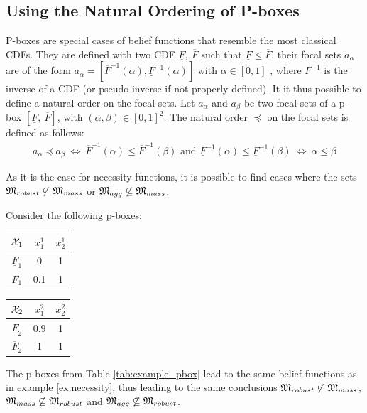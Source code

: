 \subsection{Using the Natural Ordering of P-boxes}\label{subsec:pboxes}
P-boxes are special cases of belief functions that resemble the most classical CDFs. They are defined with two CDF $\underline{F},~\overline{F}$ such that $\underline{F}\leqslant\overline{F}$, their focal sets $a_\alpha$ are of the form $a_\alpha=[\overline{F}^{-1}(\alpha), \underline{F}^{-1}(\alpha)]$ with $\alpha\in[0,1]$ \cite{destercke_unifying_2008}, where $F^{-1}$ is the inverse of a CDF (or pseudo-inverse if not properly defined). It it thus possible to define a natural order on the focal sets. Let $a_\alpha$ and $a_\beta$ be two focal sets of a p-box $[\underline{F},~\overline{F}]$, with $(\alpha,\beta)\in[0,1]^2$. The natural order $\preceq$ on the focal sets is defined as follows:
\begin{align}
    a_\alpha\preceq a_\beta ~\Leftrightarrow~ \overline{F}^{-1}(\alpha)\leqslant\overline{F}^{-1}(\beta) \text{ and } \underline{F}^{-1}(\alpha)\leqslant\underline{F}^{-1}(\beta)~\Leftrightarrow~ \alpha\leqslant\beta\label{eq:order_pbox}
\end{align}

As it is the case for necessity functions, it is possible to find cases where the sets ${\mathfrak{M}}_{robust}\not\subseteq {\mathfrak{M}}_{mass}$ or ${\mathfrak{M}}_{agg}\not\subseteq{\mathfrak{M}}_{mass}$.
\begin{example}\label{ex:pbox}
    Consider the following p-boxes:
    \begin{center}
    \begin{tabular}{|c|c|c|}
        \hline
        ${\mathcal{X}}_1$ & $x^1_1$ & $x^1_2$\\
        \hline\hline
        $\underline{F}_1$ & 0 & 1\\
        \hline
        $\overline{F}_1$ & 0.1 & 1\\
        \hline
    \end{tabular}
    \qquad
    \begin{tabular}{|c|c|c|}
        \hline
        ${\mathcal{X}}_2$ & $x^2_1$ & $x^2_2$\\
        \hline\hline
        $\underline{F}_2$ & 0.9 & 1\\
        \hline
        $\overline{F}_2$ & 1 & 1\\
        \hline
    \end{tabular}
    \label{tab:example_pbox}
    \end{center}
    The p-boxes from Table \ref{tab:example_pbox} lead to the same belief functions as in example \ref{ex:necessity}, thus leading to the same conclusions \ie ${\mathfrak{M}}_{robust}\not\subseteq{\mathfrak{M}}_{mass}$, ${\mathfrak{M}}_{mass}\not\subseteq{\mathfrak{M}}_{robust}$ and ${\mathfrak{M}}_{agg}\not\subseteq{\mathfrak{M}}_{robust}$.
\end{example}

